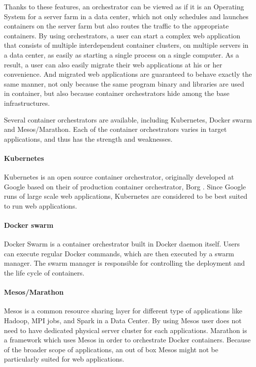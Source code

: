 Thanks to these features, an orchestrator can be viewed as if it is an Operating System for a server farm in a data center, which not only schedules and launches containers on the server farm but also routes the traffic to the appropriate containers.
By using orchestrators, a user can start a complex web application that consists of multiple interdependent container clusters, on multiple servers in a data center, as easily as starting a single process on a single computer.
As a result, a user can also easily migrate their web applications at his or her convenience.
And migrated web applications are guaranteed to behave exactly the same manner, not only because the same program binary and libraries are used in container, but also because container orchestrators hide  among the base infrastructures.

Several container orchestrators are available, including Kubernetes, Docker swarm and Mesos/Marathon.
Each of the container orchestrators varies in target applications, and thus has the strength and weaknesses.

\paragraph{Kubernetes}
Kubernetes \cite{burns2016borg} is an open source container orchestrator, originally developed at Google based on their  of production container orchestrator, Borg \cite{Verma2015}. 
Since Google runs  of large scale web applications, Kubernetes are considered to be best suited to run web applications.

\paragraph{Docker swarm}
Docker Swarm is a container orchestrator built in Docker daemon itself.
Users can execute regular Docker commands, which are then executed by a swarm manager. 
The swarm manager is responsible for controlling the deployment and the life cycle of containers.

\paragraph{Mesos/Marathon}
Mesos \cite{hindman2011mesos} is a common resource sharing layer for different type of applications like Hadoop, MPI jobs, and Spark in a Data Center. 
By using Mesos user does not need to have dedicated physical server cluster for each applications.
Marathon is a framework which uses Mesos in order to orchestrate Docker containers.
Because of the broader scope of applications, an out of box Mesos might not be particularly suited for web applications.

